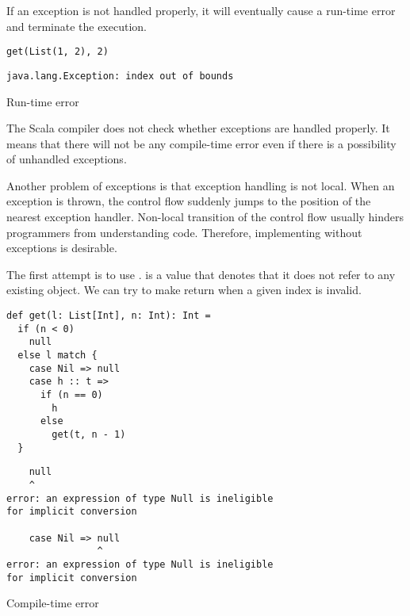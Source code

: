 If an exception is not handled properly, it will eventually cause a run-time
error and terminate the execution.

\begin{verbatim}
get(List(1, 2), 2)
\end{verbatim}
\vspace{-1em}
\begin{mdframed}[hidealllines=true,backgroundcolor=gray!10,innerleftmargin=3pt,innerrightmargin=3pt,leftmargin=-3pt,rightmargin=-3pt]
\begin{verbatim}
java.lang.Exception: index out of bounds
\end{verbatim}
\vspace{-2em}
\begin{flushright}
\scriptsize\textsf{Run-time error}
\end{flushright}
\end{mdframed}

The Scala compiler does not check whether exceptions are handled properly.
It means that there will not be any compile-time error even if there is a
possibility of unhandled exceptions.

Another problem of exceptions is that exception handling is not local.
When an exception is thrown, the control flow suddenly jumps to the position of
the nearest exception handler. Non-local transition of the control flow usually
hinders programmers from understanding code.
Therefore, implementing  without exceptions is desirable.

The first attempt is to use .  is a value that denotes that
it does not refer to any existing object. We can try to make  return
 when a given index is invalid.

\begin{verbatim}
def get(l: List[Int], n: Int): Int =
  if (n < 0)
    null
  else l match {
    case Nil => null
    case h :: t =>
      if (n == 0)
        h
      else
        get(t, n - 1)
  }
\end{verbatim}
\vspace{-1em}
\begin{mdframed}[hidealllines=true,backgroundcolor=gray!10,innerleftmargin=3pt,innerrightmargin=3pt,leftmargin=-3pt,rightmargin=-3pt]
\begin{verbatim}
    null
    ^
error: an expression of type Null is ineligible
for implicit conversion

    case Nil => null
                ^
error: an expression of type Null is ineligible
for implicit conversion
\end{verbatim}
\vspace{-2em}
\begin{flushright}
\scriptsize\textsf{Compile-time error}
\end{flushright}
\end{mdframed}

